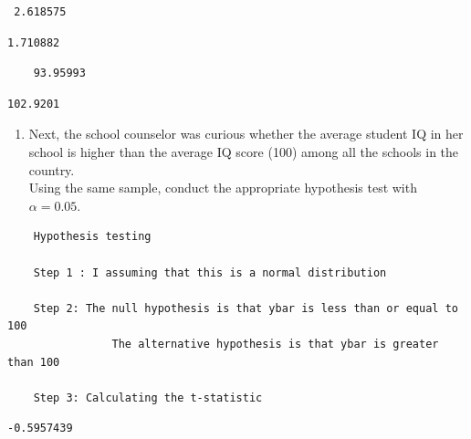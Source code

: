 \documentclass[12pt,letterpaper]{article}
\begin{document}

 \begin{verbatim}
 2.618575
 \end{verbatim}


 \begin{verbatim}
1.710882
\end{verbatim}


\begin{verbatim}
	93.95993
\end{verbatim}


\begin{verbatim}
102.9201
\end{verbatim}
		
	\begin{enumerate}
		\item Next, the school counselor was curious  whether  the average student IQ in her school is higher than the average IQ score (100) among all the schools in the country.\\ 
		
		\noindent Using the same sample, conduct the appropriate hypothesis test with $\alpha=0.05$.
	\end{enumerate}

\begin{verbatim}
	Hypothesis testing
	
	Step 1 : I assuming that this is a normal distribution
	
	Step 2: The null hypothesis is that ybar is less than or equal to 100
				The alternative hypothesis is that ybar is greater than 100
				
	Step 3: Calculating the t-statistic 
\end{verbatim}

	\begin{verbatim}
-0.5957439
	\end{verbatim}
\end{document}
